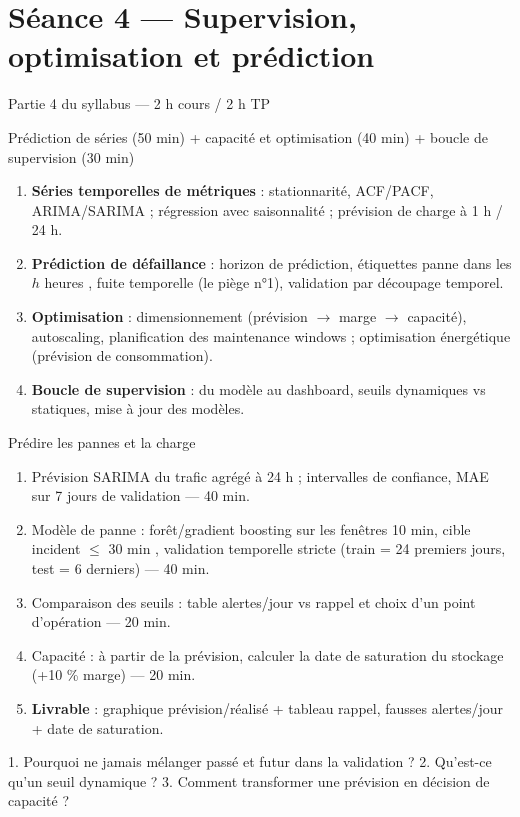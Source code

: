 \documentclass[11pt,a4paper]{article}
\begin{document}
\section*{Séance 4 — Supervision, optimisation et prédiction}
\begin{seancebox}{Partie 4 du syllabus — 2 h cours / 2 h TP}
\end{seancebox}
\begin{coursbox}{Prédiction de séries (50 min) + capacité et optimisation (40 min) + boucle de supervision (30 min)}
\begin{enumerate}[nosep]
\item \textbf{Séries temporelles de métriques} : stationnarité, ACF/PACF, ARIMA/SARIMA ; régression avec saisonnalité ; prévision de charge à 1 h / 24 h.
\item \textbf{Prédiction de défaillance} : horizon de prédiction, étiquettes \og panne dans les $h$ heures \fg{}, fuite temporelle (le piège n°1), validation par découpage temporel.
\item \textbf{Optimisation} : dimensionnement (prévision $\to$ marge $\to$ capacité), autoscaling, planification des maintenance windows ; optimisation énergétique (prévision de consommation).
\item \textbf{Boucle de supervision} : du modèle au dashboard, seuils dynamiques vs statiques, mise à jour des modèles.
\end{enumerate}
\end{coursbox}
\begin{tpbox}{Prédire les pannes et la charge}
\begin{enumerate}[nosep]
\item Prévision SARIMA du trafic agrégé à 24 h ; intervalles de confiance, MAE sur 7 jours de validation — 40 min.
\item Modèle de panne : forêt/gradient boosting sur les fenêtres 10 min, cible \og incident $\le$ 30 min \fg{}, validation temporelle stricte (train = 24 premiers jours, test = 6 derniers) — 40 min.
\item Comparaison des seuils : table \og alertes/jour vs rappel \fg{} et choix d'un point d'opération — 20 min.
\item Capacité : à partir de la prévision, calculer la date de saturation du stockage (+10 \% marge) — 20 min.
\item \textbf{Livrable} : graphique prévision/réalisé + tableau \og rappel, fausses alertes/jour \fg{} + date de saturation.
\end{enumerate}
\end{tpbox}
\begin{evalbox}
1. Pourquoi ne jamais mélanger passé et futur dans la validation ? 2. Qu'est-ce qu'un seuil dynamique ? 3. Comment transformer une prévision en décision de capacité ?
\end{evalbox}
\end{document}
